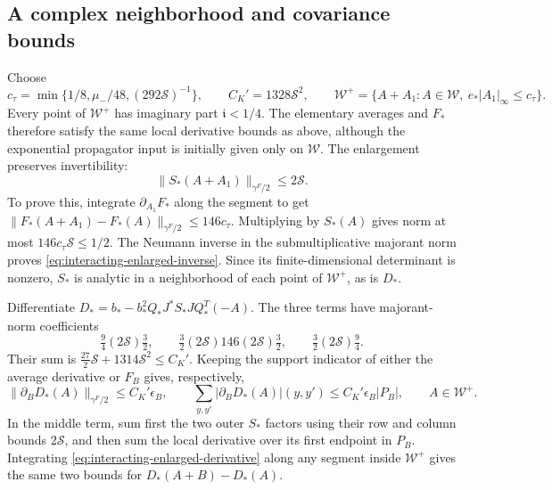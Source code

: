 \subsection{A complex neighborhood and covariance bounds}

Choose
\[
 c_\tau=\min\{1/8,\mu_-/48,(292\mathcal S)^{-1}\},\qquad
 C_K'=1328\mathcal S^2,\qquad
 \mathcal W^+=\{A+A_1:A\in\mathcal W,\ e_*|A_1|_\infty\le c_\tau\}.
\]
Every point of $\mathcal W^+$ has imaginary part
$\mathfrak i<1/4$. The elementary averages and
$F_*$ therefore satisfy the same local derivative
bounds as above, although the exponential propagator
input is initially given only on $\mathcal W$.
The enlargement preserves invertibility:
\begin{equation}\label{eq:interacting-enlarged-inverse}
 \|S_*(A+A_1)\|_{\gamma^F/2}\le2\mathcal S.
\end{equation}
To prove this, integrate $\partial_{A_1}F_*$
along the segment to get
$\|F_*(A+A_1)-F_*(A)\|_{\gamma^F/2}
\le146c_\tau$. Multiplying by $S_*(A)$ gives
norm at most $146c_\tau\mathcal S\le1/2$.
The Neumann inverse in the submultiplicative
majorant norm proves \eqref{eq:interacting-enlarged-inverse}.
Since its finite-dimensional determinant is
nonzero, $S_*$ is analytic in a neighborhood
of each point of $\mathcal W^+$, as is $D_*$.

Differentiate
$D_*=b_*-b_*^2Q_*J^*S_*JQ_*^T(-A)$.
The three terms have majorant-norm coefficients
\[
 \tfrac94(2\mathcal S)\tfrac32,\qquad
 \tfrac32(2\mathcal S)146(2\mathcal S)\tfrac32,\qquad
 \tfrac32(2\mathcal S)\tfrac94.
\]
Their sum is
$\frac{27}{2}\mathcal S+1314\mathcal S^2\le C_K'$.
Keeping the support indicator of either the
average derivative or $F_B$ gives, respectively,
\begin{equation}\label{eq:interacting-enlarged-derivative}
 \|\partial_BD_*(A)\|_{\gamma^F/2}\le C_K'\epsilon_B,\qquad
 \sum_{y,y'}|\partial_BD_*(A)|(y,y')
                                  \le C_K'\epsilon_B|P_B|,
                                      \qquad A\in\mathcal W^+.
\end{equation}
In the middle term, sum first the two outer
$S_*$ factors using their row and column bounds
$2\mathcal S$, and then sum the local derivative
over its first endpoint in $P_B$. Integrating
\eqref{eq:interacting-enlarged-derivative} along
any segment inside $\mathcal W^+$ gives the
same two bounds for $D_*(A+B)-D_*(A)$.


